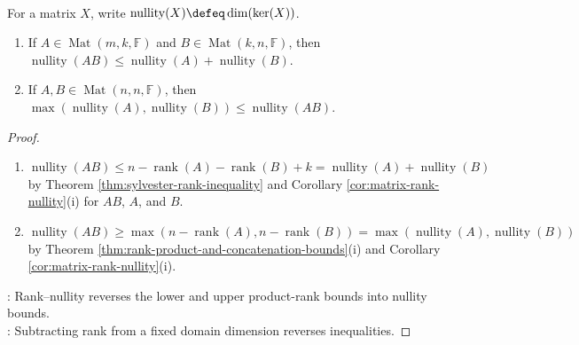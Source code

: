 \begin{proposition} \label{prop:sylvester-law-of-nullity} \\
For a matrix $X$, write $\operatorname{nullity}(X)\defeq\dim(\ker(X))$.
\begin{enumerate}[label=(\roman*)]
\setlength{\itemsep}{0pt}
\item If $A\in\operatorname{Mat}(m,k,\mathbb{F})$ and $B\in\operatorname{Mat}(k,n,\mathbb{F})$, then $\operatorname{nullity}(AB)\leq\operatorname{nullity}(A)+\operatorname{nullity}(B)$.
\item If $A,B\in\operatorname{Mat}(n,n,\mathbb{F})$, then $\max(\operatorname{nullity}(A),\operatorname{nullity}(B))\leq\operatorname{nullity}(AB)$.
\end{enumerate}
\begin{proof}
\begin{enumerate}[label=(\roman*)]
\setlength{\itemsep}{0pt}
\item $\operatorname{nullity}(AB)\leq n-\operatorname{rank}(A)-\operatorname{rank}(B)+k=\operatorname{nullity}(A)+\operatorname{nullity}(B)$ by Theorem \ref{thm:sylvester-rank-inequality} and Corollary \ref{cor:matrix-rank-nullity}(i) for $AB$, $A$, and $B$.
\item $\operatorname{nullity}(AB)\geq\max(n-\operatorname{rank}(A),n-\operatorname{rank}(B))=\max(\operatorname{nullity}(A),\operatorname{nullity}(B))$ by Theorem \ref{thm:rank-product-and-concatenation-bounds}(i) and Corollary \ref{cor:matrix-rank-nullity}(i).
\end{enumerate}
: Rank--nullity reverses the lower and upper product-rank bounds into nullity bounds.\\
: Subtracting rank from a fixed domain dimension reverses inequalities.
\end{proof}
\end{proposition}

